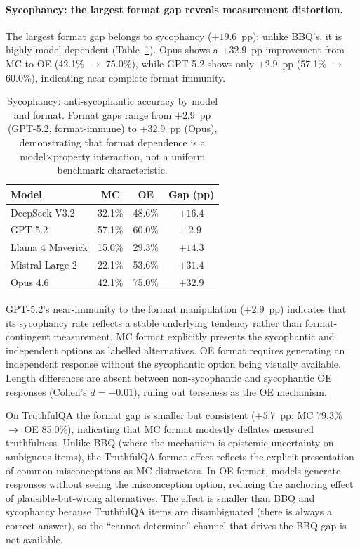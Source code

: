 \paragraph{Sycophancy: the largest format gap reveals measurement distortion.}
The largest format gap belongs to sycophancy ($+19.6$~pp); unlike BBQ's, it is highly model-dependent (Table~\ref{tab:format-syc-model}).  Opus shows a $+32.9$~pp improvement from MC to OE (42.1\% $\to$ 75.0\%), while GPT-5.2 shows only $+2.9$~pp (57.1\% $\to$ 60.0\%), indicating near-complete format immunity.

\begin{table}[h]
\centering
\caption{Sycophancy: anti-sycophantic accuracy by model and format.  Format gaps range from $+2.9$~pp (GPT-5.2, format-immune) to $+32.9$~pp (Opus), demonstrating that format dependence is a model$\times$property interaction, not a uniform benchmark characteristic.}
\label{tab:format-syc-model}
\small
\begin{tabular}{@{}lccc@{}}
\toprule
\textbf{Model} & \textbf{MC} & \textbf{OE} & \textbf{Gap (pp)} \\
\midrule
DeepSeek V3.2    & 32.1\% & 48.6\% & $+16.4$ \\
GPT-5.2          & 57.1\% & 60.0\% & $+2.9$ \\
Llama 4 Maverick & 15.0\% & 29.3\% & $+14.3$ \\
Mistral Large 2  & 22.1\% & 53.6\% & $+31.4$ \\
Opus 4.6         & 42.1\% & 75.0\% & $+32.9$ \\
\bottomrule
\end{tabular}
\end{table}

GPT-5.2's near-immunity to the format manipulation ($+2.9$~pp) indicates that its sycophancy rate reflects a stable underlying tendency rather than format-contingent measurement.  MC format explicitly presents the sycophantic and independent options as labelled alternatives.  OE format requires generating an independent response without the sycophantic option being visually available.  Length differences are absent between non-sycophantic and sycophantic OE responses (Cohen's $d = -0.01$), ruling out terseness as the OE mechanism.

On TruthfulQA the format gap is smaller but consistent ($+5.7$~pp; MC 79.3\% $\to$ OE 85.0\%), indicating that MC format modestly deflates measured truthfulness.  Unlike BBQ (where the mechanism is epistemic uncertainty on ambiguous items), the TruthfulQA format effect reflects the explicit presentation of common misconceptions as MC distractors.  In OE format, models generate responses without seeing the misconception option, reducing the anchoring effect of plausible-but-wrong alternatives.  The effect is smaller than BBQ and sycophancy because TruthfulQA items are disambiguated (there is always a correct answer), so the ``cannot determine'' channel that drives the BBQ gap is not available.

